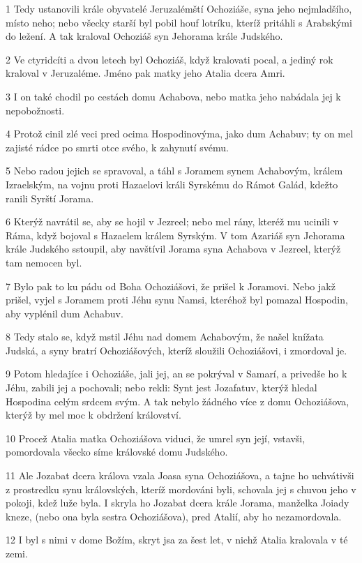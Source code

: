 \par 1 Tedy ustanovili krále obyvatelé Jeruzalémští Ochoziáše, syna jeho nejmladšího, místo neho; nebo všecky starší byl pobil houf lotríku, kteríž pritáhli s Arabskými do ležení. A tak kraloval Ochoziáš syn Jehorama krále Judského.
\par 2 Ve ctyridcíti a dvou letech byl Ochoziáš, když kralovati pocal, a jediný rok kraloval v Jeruzaléme. Jméno pak matky jeho Atalia dcera Amri.
\par 3 I on také chodil po cestách domu Achabova, nebo matka jeho nabádala jej k nepobožnosti.
\par 4 Protož cinil zlé veci pred ocima Hospodinovýma, jako dum Achabuv; ty on mel zajisté rádce po smrti otce svého, k zahynutí svému.
\par 5 Nebo radou jejich se spravoval, a táhl s Joramem synem Achabovým, králem Izraelským, na vojnu proti Hazaelovi králi Syrskému do Rámot Galád, kdežto ranili Syrští Jorama.
\par 6 Kterýž navrátil se, aby se hojil v Jezreel; nebo mel rány, kteréž mu ucinili v Ráma, když bojoval s Hazaelem králem Syrským. V tom Azariáš syn Jehorama krále Judského sstoupil, aby navštívil Jorama syna Achabova v Jezreel, kterýž tam nemocen byl.
\par 7 Bylo pak to ku pádu od Boha Ochoziášovi, že prišel k Joramovi. Nebo jakž prišel, vyjel s Joramem proti Jéhu synu Namsi, kteréhož byl pomazal Hospodin, aby vyplénil dum Achabuv.
\par 8 Tedy stalo se, když mstil Jéhu nad domem Achabovým, že našel knížata Judská, a syny bratrí Ochoziášových, kteríž sloužili Ochoziášovi, i zmordoval je.
\par 9 Potom hledajíce i Ochoziáše, jali jej, an se pokrýval v Samarí, a privedše ho k Jéhu, zabili jej a pochovali; nebo rekli: Synt jest Jozafatuv, kterýž hledal Hospodina celým srdcem svým. A tak nebylo žádného více z domu Ochoziášova, kterýž by mel moc k obdržení království.
\par 10 Procež Atalia matka Ochoziášova viduci, že umrel syn její, vstavši, pomordovala všecko síme královské domu Judského.
\par 11 Ale Jozabat dcera králova vzala Joasa syna Ochoziášova, a tajne ho uchvátivši z prostredku synu královských, kteríž mordováni byli, schovala jej s chuvou jeho v pokoji, kdež luže byla. I skryla ho Jozabat dcera krále Jorama, manželka Joiady kneze, (nebo ona byla sestra Ochoziášova), pred Atalií, aby ho nezamordovala.
\par 12 I byl s nimi v dome Božím, skryt jsa za šest let, v nichž Atalia kralovala v té zemi.

